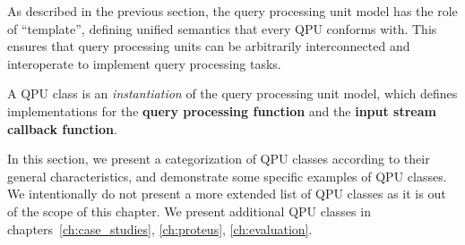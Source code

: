 As described in the previous section, the query processing unit model has the role of ``template'',
defining unified semantics that every QPU conforms with.
This ensures that query processing units can be arbitrarily interconnected and interoperate to implement query processing
tasks.

A QPU class is an \textit{instantiation} of the query processing unit model, which defines implementations for
the \textbf{query processing function} and the \textbf{input stream callback function}.

In this section, we present a categorization of QPU classes according to their general characteristics,
and demonstrate some specific examples of QPU classes.
We intentionally do not present a more extended list of QPU classes as it is out of the scope of this chapter.
We present additional QPU classes in chapters~\ref{ch:case_studies}, \ref{ch:proteus}, \ref{ch:evaluation}.

